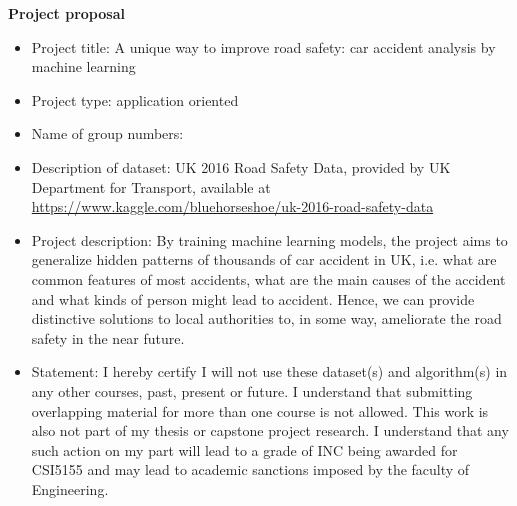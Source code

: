 \documentclass{article}
\begin{document}
\textbf{Project proposal}
\begin{itemize}
\item Project title: A unique way to improve road safety: car accident analysis by machine learning
\item Project type: application oriented
\item Name of group numbers:
\item Description of dataset: UK 2016 Road Safety Data, provided by UK Department for Transport, available at \url{https://www.kaggle.com/bluehorseshoe/uk-2016-road-safety-data}

\item Project description: By training machine learning models, the project aims to generalize hidden patterns of thousands of car accident in UK, i.e. what are common features of most accidents, what are the main causes of the accident and what kinds of person might lead to accident. Hence, we can provide distinctive solutions to local authorities to, in some way, ameliorate the road safety in the near future.
\item Statement: I hereby certify I will not use
these dataset(s) and algorithm(s) in any other courses, past, present or future. I understand that
submitting overlapping material for more than one course is not allowed. This work is also not
part of my thesis or capstone project research. I understand that any such action on my part will
lead to a grade of INC being awarded for CSI5155 and may lead to academic sanctions imposed
by the faculty of Engineering.
\end{itemize}
\end{document}

